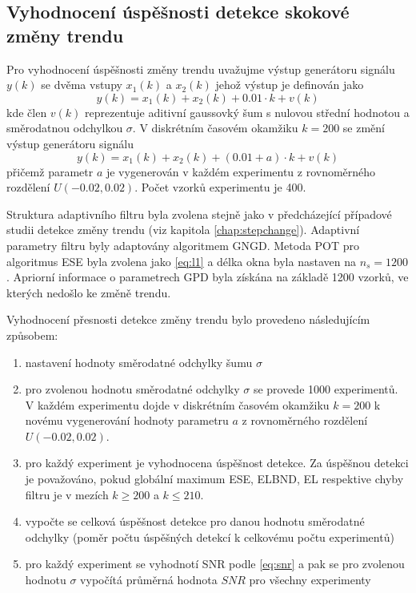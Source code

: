 \subsection{Vyhodnocení úspěšnosti detekce skokové změny trendu}
Pro vyhodnocení úspěšnosti změny trendu uvažujme výstup generátoru signálu $y(k)$ se dvěma vstupy $x_1(k)$ a $x_2(k)$ jehož výstup je definován jako
\begin{equation}\label{eq:trnd_stats}
    y(k) = x_1(k) + x_2(k) + 0.01 \cdot k + v(k)
\end{equation}
kde člen $v(k)$ reprezentuje aditivní gaussovký šum s nulovou střední hodnotou a směrodatnou odchylkou $\sigma$. V diskrétním časovém okamžiku $k=200$ se změní výstup generátoru signálu
\begin{equation}
    y(k) = x_1(k) + x_2(k) + (0.01 + a) \cdot k + v(k)
\end{equation}
přičemž parametr $a$ je vygenerován v každém experimentu z rovnoměrného rozdělení $U(-0.02,0.02)$. Počet vzorků experimentu je 400.
\par 
Struktura adaptivního filtru byla zvolena stejně jako v předcházející případové studii detekce změny trendu (viz kapitola \ref{chap:stepchange}). Adaptivní parametry filtru byly adaptovány algoritmem GNGD. Metoda POT pro algoritmus ESE byla zvolena jako \ref{eq:l1} a délka okna byla nastaven na $n_s=1200$. Apriorní informace o parametrech GPD byla získána na základě 1200 vzorků, ve kterých nedošlo ke změně trendu. 
\par 
Vyhodnocení přesnosti detekce změny trendu bylo provedeno následujícím způsobem:
\begin{enumerate}
\item nastavení hodnoty směrodatné odchylky šumu $\sigma$
\item pro zvolenou hodnotu směrodatné odchylky $\sigma$ se provede 1000 experimentů. V každém experimentu dojde v diskrétním časovém okamžiku $k=200$ k  novému vygenerování hodnoty parametru $a$ z rovnoměrného rozdělení $U(-0.02,0.02)$.
\item pro každý experiment je vyhodnocena úspěšnost detekce. Za úspěšnou detekci je považováno, pokud globální maximum ESE, ELBND, EL respektive chyby filtru je v mezích $k\geq 200$ a $k\leq 210$. 
\item vypočte se celková úspěšnost detekce pro danou hodnotu směrodatné odchylky (poměr počtu úspěšných detekcí k celkovému počtu experimentů)
\item pro každý experiment se vyhodnotí SNR podle \ref{eq:snr} a pak se pro zvolenou hodnotu $\sigma$ vypočítá průměrná hodnota $SNR$ pro všechny experimenty
\end{enumerate}

